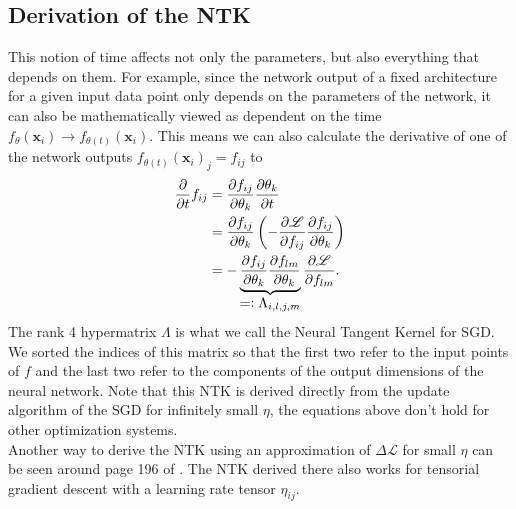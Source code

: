 \subsection{Derivation of the NTK}
This notion of time affects not only the parameters, but also everything that depends on them. For example, since the network output of a fixed architecture for a given input data point only depends on the parameters of the network, it can also be mathematically viewed as dependent on the time $f_{\theta}(\mathbf{x}_i) \rightarrow f_{\theta(t)}(\mathbf{x}_i)$. This means we can also calculate the derivative of one of the network outputs $f_{\theta(t)}(\mathbf{x}_i)_j = f_{ij}$ to
\begin{align}
	\pAbl{}{t} f_{ij} &= \pAbl{f_{ij}}{\theta_k}\pAbl{\theta_k}{t}\nonumber\\
	&= \pAbl{f_{ij}}{\theta_k} \left(- \pAbl{\mathscr{L}}{f_{ij}} \pAbl{f_{ij}}{\theta_k} \right)\label{eq:NTKarisesFromHere}\\
	&= - \underbrace{\pAbl{f_{ij}}{\theta_k} \pAbl{f_{lm}}{\theta_k}}_\mathlarger{=\vcentcolon \Lambda_{i,l,j,m}}
	\pAbl{\mathscr{L}}{f_{lm}}.\nonumber
\end{align}
The rank 4 hypermatrix $\Lambda$ is what we call the Neural Tangent Kernel for SGD. We sorted the indices of this matrix so that the first two refer to the input points of $f$ and the last two refer to the components of the output dimensions of the neural network. Note that this NTK is derived directly from the update algorithm of the SGD for infinitely small $\eta$, the equations above don't hold for other optimization systems.\\
Another way to derive the NTK using an approximation of $\Delta \mathscr{L}$ for small $\eta$ can be seen around page 196 of \cite{ThePrinciplesOfDeepLearningTheory}. The NTK derived there also works for tensorial gradient descent with a learning rate tensor $\eta_{ij}$.